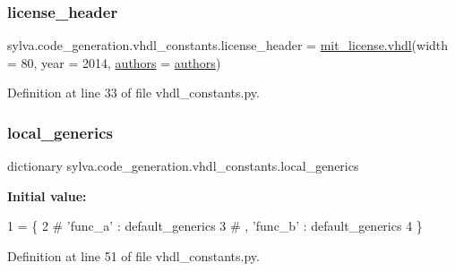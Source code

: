 \subsubsection{\texorpdfstring{license\+\_\+header}{license\_header}}
{\footnotesize\ttfamily sylva.\+code\+\_\+generation.\+vhdl\+\_\+constants.\+license\+\_\+header = \hyperlink{namespacesylva_1_1code__generation_1_1mit__license_a5c8d9ae3b2d4db392cdc66e37b035675}{mit\+\_\+license.\+vhdl}(width = 80, year = 2014, \hyperlink{namespacesylva_1_1code__generation_1_1vhdl__constants_a72f8afbb7160fba2099c3cfce5067148}{authors} = \hyperlink{namespacesylva_1_1code__generation_1_1vhdl__constants_a72f8afbb7160fba2099c3cfce5067148}{authors})}



Definition at line 33 of file vhdl\+\_\+constants.\+py.

\mbox{\label{namespacesylva_1_1code__generation_1_1vhdl__constants_a6f7d7c9bc3eb45cb64276fe779c52d83}} 
\subsubsection{\texorpdfstring{local\+\_\+generics}{local\_generics}}
{\footnotesize\ttfamily dictionary sylva.\+code\+\_\+generation.\+vhdl\+\_\+constants.\+local\+\_\+generics}

{\bfseries Initial value\+:}
\begin{DoxyCode}
1 =  \{
2                  \textcolor{comment}{# 'func\_a' : default\_generics}
3                  \textcolor{comment}{# , 'func\_b' : default\_generics}
4                  \}
\end{DoxyCode}


Definition at line 51 of file vhdl\+\_\+constants.\+py.

\mbox{\label{namespacesylva_1_1code__generation_1_1vhdl__constants_a3e666173c3556509eef03cd2ef567ba1}} 
